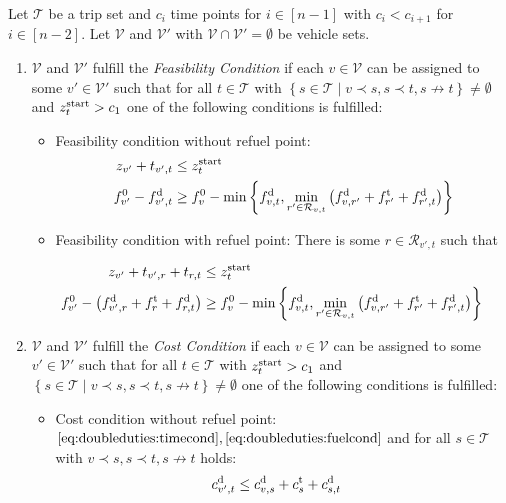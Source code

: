 \begin{definition}[Conditions]
Let $\mathcal{T}$ be a trip set and $c_i$ time points for ${i\in[n-1]}$ with $c_i<c_{i+1}$ for ${i\in[n-2]}$. Let $\mathcal{V}$ and  $\mathcal{V}'$ with ${\mathcal{V}\cap\mathcal{V}'=\emptyset}$ be vehicle sets.
\begin{enumerate}
	\item $\mathcal{V}$ and $\mathcal{V}'$ fulfill the \emph{Feasibility Condition} if each $v\in\mathcal{V}$ can be assigned to some ${v'\in\mathcal{V}'}$ such that for all ${t\in\mathcal{T}}$ with ${\left\{s\in\mathcal{T}\mid v\prec s, s\prec t, s\not\to t\right\}\neq\emptyset}$ and ${z^{\operatorname{start}}_t>c_1}$ one of the following conditions is fulfilled:
	\begin{itemize}
		\item Feasibility condition without refuel point:
			\begin{align}
				z_{v'} + t_{v',t} & \leq z^{\operatorname{start}}_t \label{eq:doubleduties:timecond} \\
				f^0_{v'} - f^{\operatorname{d}}_{v',t} & \geq f^0_v - \min\left\{f^{\operatorname{d}}_{v,t},\min_{r'\in\mathcal{R}_{v,t}}\left(f^{\operatorname{d}}_{v,r'}+f^{\operatorname{t}}_{r'}+f^{\operatorname{d}}_{r',t}\right)\right\} \label{eq:doubleduties:fuelcond}
			\end{align}
		\item Feasibility condition with refuel point: There is some ${r\in\mathcal{R}_{v',t}}$ such that
		\end{itemize}
			\begin{align}
				z_{v'} + t_{v',r} + t_{r,t} & \leq z^{\operatorname{start}}_t \label{eq:doubleduties:timecond_r} \\
				f^0_{v'} - \left(f^{\operatorname{d}}_{v',r} + f^{\operatorname{t}}_r + f^{\operatorname{d}}_{r,t}\right) & \geq f^0_v - \min\left\{f^{\operatorname{d}}_{v,t},\min_{r'\in\mathcal{R}_{v,t}}\left(f^{\operatorname{d}}_{v,r'}+f^{\operatorname{t}}_{r'}+f^{\operatorname{d}}_{r',t}\right)\right\} \label{eq:doubleduties:fuelcond_r}
			\end{align}
	\item $\mathcal{V}$ and $\mathcal{V}'$ fulfill the \emph{Cost Condition} if each $v\in\mathcal{V}$ can be assigned to some ${v'\in\mathcal{V}'}$ such that for all ${t\in\mathcal{T}}$ with ${z^{\operatorname{start}}_t>c_1}$ and ${\left\{s\in\mathcal{T}\mid v\prec s, s\prec t, s\not\to t\right\}\neq\emptyset}$ one of the following conditions is fulfilled:
	\begin{itemize}
		\item Cost condition without refuel point: $\eqref{eq:doubleduties:timecond}, \eqref{eq:doubleduties:fuelcond}$ and for all $s\in\mathcal{T}$ with ${v\prec s, s\prec t, s\not\to t}$ holds:
			\begin{align}
				\cd_{v',t} & \leq \cd_{v,s} + \ct_s + \cd_{s,t} \label{eq:doubleduties:costcond}

\end{align}
\end{itemize}
\end{enumerate}
\end{definition}
